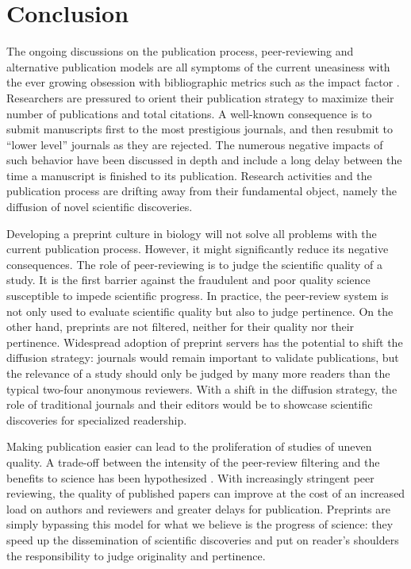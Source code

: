 \documentclass[letterpaper]{article}
\begin{document}
\section{Conclusion}

The ongoing discussions on the publication process, peer-reviewing and 
alternative publication models are all symptoms of the current uneasiness 
with the ever growing obsession with bibliographic metrics such as the 
impact factor \cite{Fisher2012}. Researchers are pressured to orient their 
publication strategy to maximize their number of publications and total 
citations. A well-known consequence is to submit manuscripts first to the 
most prestigious journals, and then resubmit to ``lower level'' journals as 
they are rejected. The numerous negative impacts of such behavior have been 
discussed in depth \cite{hoc09} and include a long delay between the time a 
manuscript is finished to its publication. Research activities and the 
publication process are drifting away from their fundamental object, namely 
the diffusion of novel scientific discoveries. 

Developing a preprint culture in biology will not solve all problems with 
the current publication process. However, it might significantly reduce its 
negative consequences. The role of peer-reviewing is to judge the scientific 
quality of a study. It is the first barrier against the fraudulent and poor 
quality science susceptible to impede scientific progress. In practice, the 
peer-review system is not only used to evaluate scientific quality but also 
to judge pertinence. On the other hand, preprints are not filtered, neither 
for their quality nor their pertinence. Widespread adoption of preprint 
servers has the potential to shift the diffusion strategy: journals would 
remain important to validate publications, but the relevance of a study 
should only be judged by many more readers than the typical two-four 
anonymous reviewers. With a shift in the diffusion strategy, the role of 
traditional journals and their editors would be to showcase scientific 
discoveries for specialized readership. 

Making publication easier can lead to the proliferation of studies of uneven 
quality. A trade-off between the intensity of the peer-review filtering and 
the benefits to science has been hypothesized \cite{Aarssen2012}.  With 
increasingly stringent peer reviewing, the quality of published papers can 
improve at the cost of an increased load on authors and 
reviewers and greater delays for publication.  Preprints are simply 
bypassing this model for what we believe is the progress of science: they 
speed up the dissemination of scientific discoveries and put on reader's 
shoulders the responsibility to judge originality and pertinence.
\end{document}
